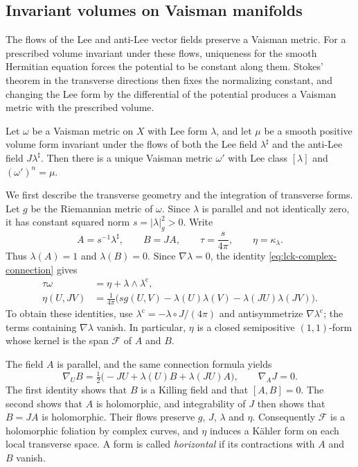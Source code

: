\subsection{Invariant volumes on Vaisman manifolds}
\label{subsec:lck-vaisman-volume}

The flows of the Lee and anti-Lee vector fields preserve a Vaisman metric. For a prescribed volume invariant under these flows, uniqueness for the smooth Hermitian equation forces the potential to be constant along them. Stokes' theorem in the transverse directions then fixes the normalizing constant, and changing the Lee form by the differential of the potential produces a Vaisman metric with the prescribed volume.

\begin{theorem}\label{thm:lck-vaisman-volume}
Let $\omega$ be a Vaisman metric on $X$ with Lee form $\lambda$, and let $\mu$ be a smooth positive volume form invariant under the flows of both the Lee field $\lambda^\sharp$ and the anti-Lee field $J\lambda^\sharp$. Then there is a unique Vaisman metric $\omega'$ with Lee class $[\lambda]$ and $(\omega')^n=\mu$.
\end{theorem}

We first describe the transverse geometry and the integration of transverse forms. Let $g$ be the Riemannian metric of $\omega$. Since $\lambda$ is parallel and not identically zero, it has constant squared norm $s=|\lambda|_g^2>0$. Write
\[
 A=s^{-1}\lambda^\sharp,\qquad B=JA,\qquad
 \tau=\frac{s}{4\pi},\qquad \eta=\kappa_\lambda.
\]
Thus $\lambda(A)=1$ and $\lambda(B)=0$. Since $\nabla\lambda=0$, the identity \eqref{eq:lck-complex-connection} gives
\begin{equation}\label{eq:vaisman-normalized-form}
 \begin{split}
 \tau\omega&=\eta+\lambda\wedge\lambda^{\mathrm c},\\
 \eta(U,JV)&=\frac1{4\pi}\bigl(sg(U,V)-\lambda(U)\lambda(V)-\lambda(JU)\lambda(JV)\bigr).
 \end{split}
\end{equation}
To obtain these identities, use $\lambda^{\mathrm c}=-\lambda\circ J/(4\pi)$ and antisymmetrize $\nabla\lambda^{\mathrm c}$; the terms containing $\nabla\lambda$ vanish. In particular, $\eta$ is a closed semipositive $(1,1)$-form whose kernel is the span $\mathcal F$ of $A$ and $B$.

The field $A$ is parallel, and the same connection formula yields
\[
 \nabla_U B=\tfrac12\bigl(-JU+\lambda(U)B+\lambda(JU)A\bigr),
 \qquad \nabla_AJ=0.
\]
The first identity shows that $B$ is a Killing field and that $[A,B]=0$. The second shows that $A$ is holomorphic, and integrability of $J$ then shows that $B=JA$ is holomorphic. Their flows preserve $g$, $J$, $\lambda$ and $\eta$. Consequently $\mathcal F$ is a holomorphic foliation by complex curves, and $\eta$ induces a K\"ahler form on each local transverse space. A form is called \emph{horizontal} if its contractions with $A$ and $B$ vanish.

